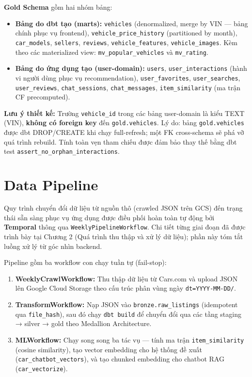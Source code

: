 \noindent \textbf{Gold Schema} gồm hai nhóm bảng:
\begin{itemize}
    \item \textbf{Bảng do dbt tạo (marts):} \texttt{vehicles} (denormalized, merge by VIN — bảng chính phục vụ frontend), \texttt{vehicle\_price\_history} (partitioned by month), \texttt{car\_models}, \texttt{sellers}, \texttt{reviews}, \texttt{vehicle\_features}, \texttt{vehicle\_images}. Kèm theo các materialized view: \texttt{mv\_popular\_vehicles} và \texttt{mv\_rating}.
    \item \textbf{Bảng do ứng dụng tạo (user-domain):} \texttt{users}, \texttt{user\_interactions} (hành vi người dùng phục vụ recommendation), \texttt{user\_favorites}, \texttt{user\_searches}, \texttt{user\_reviews}, \texttt{chat\_sessions}, \texttt{chat\_messages}, \texttt{item\_similarity} (ma trận CF precomputed).
\end{itemize}

\textbf{Lưu ý thiết kế:} Trường \texttt{vehicle\_id} trong các bảng user-domain là kiểu TEXT (VIN), \textbf{không có foreign key} đến \texttt{gold.vehicles}. Lý do: bảng \texttt{gold.vehicles} được dbt DROP/CREATE khi chạy full-refresh; một FK cross-schema sẽ phá vỡ quá trình rebuild. Tính toàn vẹn tham chiếu được đảm bảo thay thế bằng dbt test \texttt{assert\_no\_orphan\_interactions}.

\section{Data Pipeline}

Quy trình chuyển đổi dữ liệu từ nguồn thô (crawled JSON trên GCS) đến trạng thái sẵn sàng phục vụ ứng dụng được điều phối hoàn toàn tự động bởi \textbf{Temporal} thông qua \texttt{WeeklyPipelineWorkflow}. Chi tiết từng giai đoạn đã được trình bày tại Chương 2 (Quá trình thu thập và xử lý dữ liệu); phần này tóm tắt luồng xử lý từ góc nhìn backend.

Pipeline gồm ba workflow con chạy tuần tự (fail-stop):

\begin{enumerate}
    \item \textbf{WeeklyCrawlWorkflow:} Thu thập dữ liệu từ Cars.com và upload JSON lên Google Cloud Storage theo cấu trúc phân vùng ngày \texttt{dt=YYYY-MM-DD/}.
    \item \textbf{TransformWorkflow:} Nạp JSON vào \texttt{bronze.raw\_listings} (idempotent qua \texttt{file\_hash}), sau đó chạy \texttt{dbt build} để chuyển đổi qua các tầng staging → silver → gold theo Medallion Architecture.
    \item \textbf{MLWorkflow:} Chạy song song ba tác vụ — tính ma trận \texttt{item\_similarity} (cosine similarity), tạo vector embedding cho hệ thống đề xuất (\texttt{car\_chatbot\_vectors}), và tạo chunked embedding cho chatbot RAG (\texttt{car\_vectorize}).
\end{enumerate}

